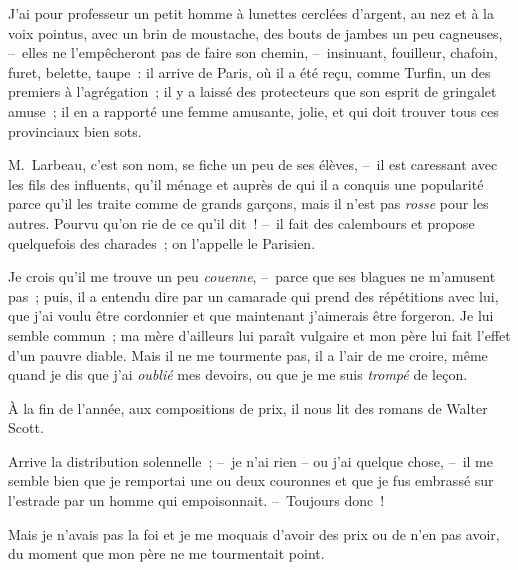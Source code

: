 \documentclass[french,twoside]{book} %
\def\mednobreak{\ifdim\lastskip<\medskipamount
  \removelastskip\nopagebreak\medskip\fi}
\newcommand{\labelblock}[1]{\medbreak{\noindent\color{rubric}\bfseries #1}\par\mednobreak}
\begin{document}
\noindent J’ai pour professeur un petit homme à lunettes cerclées d’argent, au nez et à la voix pointus, avec un brin de moustache, des bouts de jambes un peu cagneuses, – elles ne l’empêcheront pas de faire son chemin, – insinuant, fouilleur, chafoin, furet, belette, taupe : il arrive de Paris, où il a été reçu, comme Turfin, un des premiers à l’agrégation ; il y a laissé des protecteurs que son esprit de gringalet amuse ; il en a rapporté une femme amusante, jolie, et qui doit trouver tous ces provinciaux bien sots.\par
M. Larbeau, c’est son nom, se fiche un peu de ses élèves, – il est caressant avec les fils des influents, qu’il ménage et auprès de qui il a conquis une popularité parce qu’il les traite comme de grands garçons, mais il n’est pas \emph{rosse} pour les autres. Pourvu qu’on rie de ce qu’il dit ! – il fait des calembours et propose quelquefois des charades ; on l’appelle le Parisien.\par
Je crois qu’il me trouve un peu \emph{couenne}, – parce que ses blagues ne m’amusent pas ; puis, il a entendu dire par un camarade qui prend des répétitions avec lui, que j’ai voulu être cordonnier et que maintenant j’aimerais être forgeron. Je lui semble commun ; ma mère d’ailleurs lui paraît vulgaire et mon père lui fait l’effet d’un pauvre diable. Mais il ne me tourmente pas, il a l’air de me croire, même quand je dis que j’ai \emph{oublié} mes devoirs, ou que je me suis \emph{trompé} de leçon.\par
À la fin de l’année, aux compositions de prix, il nous lit des romans de Walter Scott.\par
\bigbreak
\noindent Arrive la distribution solennelle ; – je n’ai rien – ou j’ai quelque chose, – il me semble bien que je remportai une ou deux couronnes et que je fus embrassé sur l’estrade par un homme qui empoisonnait. – Toujours donc !\par
Mais je n’avais pas la foi et je me moquais d’avoir des prix ou de n’en pas avoir, du moment que mon père ne me tourmentait point.\par

\labelblock{LA MAISON}
\end{document}
